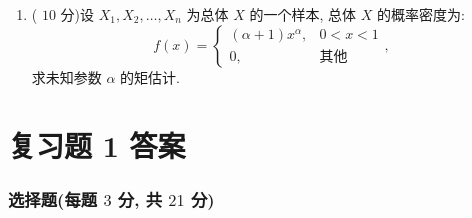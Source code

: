 \documentclass[cn,11pt,fancy,hide]{elegantbook}
\begin{document}
\begin{enumerate}
	\item ( $10$ 分)设 $X_1,X_2,\ldots,X_n$ 为总体 $X$ 的一个样本, 总体 $X$ 的概率密度为:
	\begin{equation*}
		f(x)=
		\begin{cases}
		(\alpha+1)x^\alpha, & 0<x<1\\
		0, & \text{其他}
		\end{cases},
	\end{equation*}
	求未知参数 $\alpha$ 的矩估计.
\end{enumerate}

\section{复习题 1 答案}
\subsubsection{选择题(每题 $3$ 分, 共 $21$ 分)}
\end{document}
